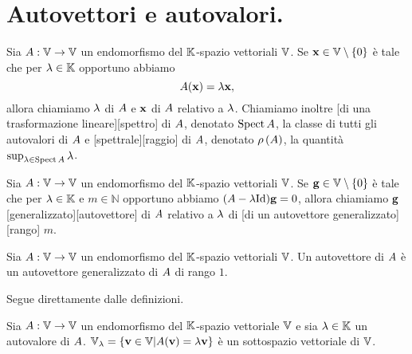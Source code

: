 \section{Autovettori e autovalori.}\label{AutovettoriEAutovalori}
\begin{Definition}
	Sia $A: \mathbb{V} \rightarrow \mathbb{V}$ un
  endomorfismo del $\mathbb{K}$-spazio vettoriali $\mathbb{V}$.
  Se $\Eigenvector \in \LinearSpace \SetMin \lbrace 0 \rbrace$ \`e tale che per
  $\lambda \in \mathbb{K}$ opportuno abbiamo
  \[
    \LinearTransformation(\Eigenvector) = \Eigenvalue \Eigenvector,
  \]
  allora chiamiamo $\lambda$  di
  $A$ e $\Eigenvector$  di
  $A$ relativo a $\lambda$.
  Chiamiamo inoltre
  [di una trasformazione lineare][spettro]
  di $A$, denotato $\operatorname{Spect}{A}$,
  la classe di tutti gli autovalori di $A$ e
  [spettrale][raggio] di $A$,
  denotato $\rho \left ( A \right )$, la quantit\`a
  $\sup_{\lambda \in \operatorname{Spect}{A}} \lambda$.
\end{Definition}
\begin{Definition}
	Sia $A: \mathbb{V} \rightarrow \mathbb{V}$ un
  endomorfismo del $\mathbb{K}$-spazio vettoriali $\mathbb{V}$.
  Se $\GeneralizedEigenvector \in \LinearSpace \SetMin \lbrace 0 \rbrace$ \`e
  tale che per
  $\lambda \in \mathbb{K}$ e $m \in \mathbb{N}$ opportuno abbiamo
  $(\LinearTransformation - \Eigenvalue \Identity)\GeneralizedEigenvector = 0$,
  allora chiamiamo
  $\GeneralizedEigenvector$
  [generalizzato][autovettore] di
  $A$ relativo a $\lambda$ di
  [di un autovettore generalizzato][rango] $m$.
\end{Definition}
\begin{Theorem}
	Sia $A: \mathbb{V} \rightarrow \mathbb{V}$ un
  endomorfismo del $\mathbb{K}$-spazio vettoriali $\mathbb{V}$.
  Un autovettore di $A$ \`e un autovettore generalizzato
  di $A$ di rango $1$.
\end{Theorem}
\Proof Segue direttamente dalle definizioni. \EndProof
\begin{Theorem}
	Sia $A: \mathbb{V} \rightarrow \mathbb{V}$ un
  endomorfismo del $\mathbb{K}$-spazio vettoriale $\mathbb{V}$ e sia
  $\lambda \in \mathbb{K}$ un autovalore di $A$.
  $\mathbb{V}_\lambda
    = \lbrace \mathbf{v} \in \mathbb{V} | A(\mathbf{v})
    = \lambda\mathbf{v} \rbrace$
  \`e un sottospazio vettoriale di $\mathbb{V}$.
\end{Theorem}
